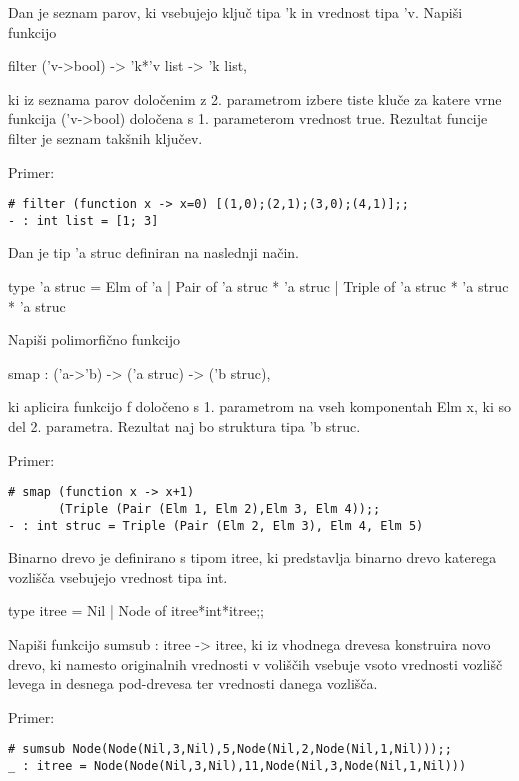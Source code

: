 \begin{ex}
  Dan je seznam parov, ki vsebujejo klju\v c tipa 'k in vrednost tipa
  'v. Napi\v si funkcijo

  filter ('v->bool) -> 'k*'v list -> 'k list,

  ki iz seznama parov dolo\v cenim z 2. parametrom izbere tiste klu\v
  ce za katere vrne funkcija ('v->bool) dolo\v cena s 1. parameterom
  vrednost true. Rezultat funcije filter je seznam tak\v snih klju\v
  cev.

\noindent\/Primer:
\begin{verbatim}
# filter (function x -> x=0) [(1,0);(2,1);(3,0);(4,1)];; 
- : int list = [1; 3] 

\end{verbatim}

\end{ex} 
\begin{ex}
  Dan je tip 'a struc definiran na naslednji na\v cin.

  type 'a struc = 
      Elm of 'a 
    | Pair of 'a struc * 'a struc 
    | Triple of 'a struc * 'a struc * 'a struc

  Napi\v si polimorfi\v cno funkcijo

  smap : ('a->'b) -> ('a struc) -> ('b struc),

  ki aplicira funkcijo f dolo\v ceno s 1. parametrom na vseh
  komponentah Elm x, ki so del 2. parametra. Rezultat naj bo struktura
  tipa 'b struc.

\noindent\/Primer:            
\begin{verbatim}
# smap (function x -> x+1) 
       (Triple (Pair (Elm 1, Elm 2),Elm 3, Elm 4));; 
- : int struc = Triple (Pair (Elm 2, Elm 3), Elm 4, Elm 5) 
\end{verbatim}

\end{ex} 
\begin{ex}
  Binarno drevo je definirano s tipom itree, ki predstavlja binarno
  drevo katerega vozli\v s\v ca vsebujejo vrednost tipa int.

  type itree = Nil | Node of itree*int*itree;;

  Napi\v si funkcijo sumsub : itree -> itree, ki iz vhodnega drevesa
  konstruira novo drevo, ki namesto originalnih vrednosti v voli\v s\v
  cih vsebuje vsoto vrednosti vozli\v s\v c levega in desnega
  pod-drevesa ter vrednosti danega vozli\v s\v ca.

\noindent\/Primer:
\begin{verbatim}
# sumsub Node(Node(Nil,3,Nil),5,Node(Nil,2,Node(Nil,1,Nil)));;
_ : itree = Node(Node(Nil,3,Nil),11,Node(Nil,3,Node(Nil,1,Nil)))
\end{verbatim}


\end{ex} 
